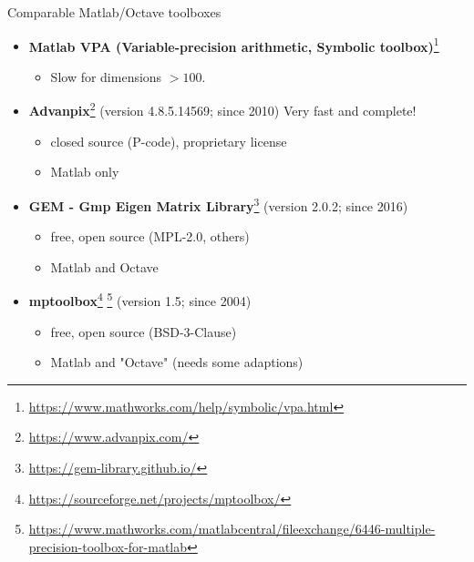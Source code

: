 \begin{frame}{Comparable Matlab/Octave toolboxes}

\begin{itemize}\itemsep0.5em

\item
\textbf{Matlab VPA (Variable-precision arithmetic,
Symbolic toolbox)}\footnote{\tiny
\url{https://www.mathworks.com/help/symbolic/vpa.html}}
\begin{itemize}
\item
Slow for dimensions $> 100$.
\end{itemize}

\item
\textbf{Advanpix}\footnote{\tiny
\url{https://www.advanpix.com/}}
(version 4.8.5.14569; since 2010)
{\color{red} Very fast and complete!}
\begin{itemize}
\item
{\color{blue} closed source} (P-code), proprietary license

\item
Matlab only
\end{itemize}

\item
\textbf{GEM - Gmp Eigen Matrix Library}\footnote{\tiny
\url{https://gem-library.github.io/}}
(version 2.0.2; since 2016)
\begin{itemize}
\item
free, open source (MPL-2.0, others)

\item
Matlab and Octave
\end{itemize}

\item
\textbf{mptoolbox}\footnote{\tiny
\url{https://sourceforge.net/projects/mptoolbox/}}
\footnote{\tiny
\url{https://www.mathworks.com/matlabcentral/fileexchange/6446-multiple-precision-toolbox-for-matlab}}
(version 1.5; since 2004)
\begin{itemize}
\item
free, open source (BSD-3-Clause)

\item
Matlab and "Octave" (needs some adaptions)
\end{itemize}

\end{itemize}

\end{frame}
